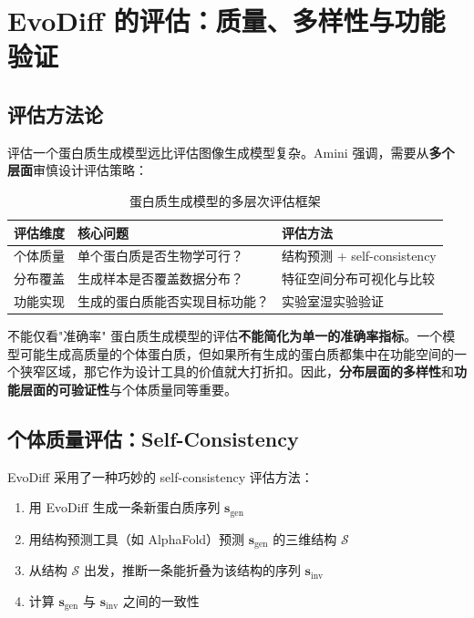 \section{EvoDiff 的评估：质量、多样性与功能验证}

\subsection{评估方法论}

评估一个蛋白质生成模型远比评估图像生成模型复杂。Amini 强调，需要从\textbf{多个层面}审慎设计评估策略：

\begin{table}[H]
\centering
\caption{蛋白质生成模型的多层次评估框架}
\begin{tabular}{@{}lll@{}}
\toprule
\textbf{评估维度} & \textbf{核心问题} & \textbf{评估方法} \\
\midrule
个体质量 & 单个蛋白质是否生物学可行？ & 结构预测 + self-consistency \\
分布覆盖 & 生成样本是否覆盖数据分布？ & 特征空间分布可视化与比较 \\
功能实现 & 生成的蛋白质能否实现目标功能？ & 实验室湿实验验证 \\
\bottomrule
\end{tabular}
\end{table}

\begin{warningbox}{不能仅看"准确率"}
蛋白质生成模型的评估\textbf{不能简化为单一的准确率指标}。一个模型可能生成高质量的个体蛋白质，但如果所有生成的蛋白质都集中在功能空间的一个狭窄区域，那它作为设计工具的价值就大打折扣。因此，\textbf{分布层面的多样性}和\textbf{功能层面的可验证性}与个体质量同等重要。
\end{warningbox}

\subsection{个体质量评估：Self-Consistency}

EvoDiff 采用了一种巧妙的 self-consistency 评估方法：

\begin{enumerate}
    \item 用 EvoDiff 生成一条新蛋白质序列 $\mathbf{s}_{\text{gen}}$
    \item 用结构预测工具（如 AlphaFold）预测 $\mathbf{s}_{\text{gen}}$ 的三维结构 $\mathcal{S}$
    \item 从结构 $\mathcal{S}$ 出发，推断一条能折叠为该结构的序列 $\mathbf{s}_{\text{inv}}$
    \item 计算 $\mathbf{s}_{\text{gen}}$ 与 $\mathbf{s}_{\text{inv}}$ 之间的一致性
\end{enumerate}


